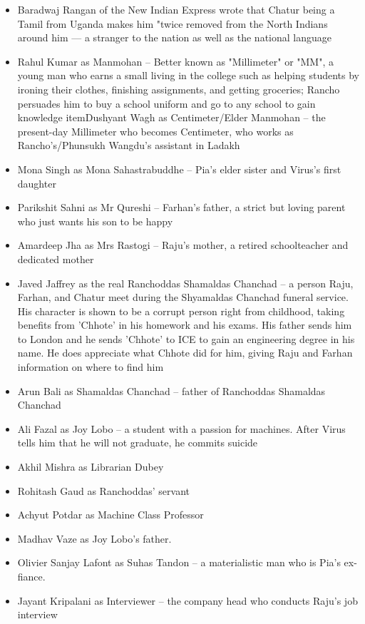 \documentclass{article}
\begin{document}
\begin{itemize}
    \item{Baradwaj Rangan of the New Indian Express wrote that Chatur being a Tamil from Uganda makes him "twice removed from the North Indians around him — a stranger to the nation as well as the national language}
    \item{Rahul Kumar as Manmohan – Better known as "Millimeter" or "MM", a young man who earns a small living in the college such as helping students by ironing their clothes, finishing assignments, and getting groceries; Rancho persuades him to buy a school uniform and go to any school to gain knowledge}
    item{Dushyant Wagh as Centimeter/Elder Manmohan – the present-day Millimeter who becomes Centimeter, who works as Rancho's/Phunsukh Wangdu's assistant in Ladakh}
    \item{Mona Singh as Mona Sahastrabuddhe – Pia's elder sister and Virus's first daughter}
    \item{Parikshit Sahni as Mr Qureshi – Farhan's father, a strict but loving parent who just wants his son to be happy}
    \item{Amardeep Jha as Mrs Rastogi – Raju's mother, a retired schoolteacher and dedicated mother}
    \item{Javed Jaffrey as the real Ranchoddas Shamaldas Chanchad – a person Raju, Farhan, and Chatur meet during the Shyamaldas Chanchad funeral service. His character is shown to be a corrupt person right from childhood, taking benefits from 'Chhote' in his homework and his exams. His father sends him to London and he sends 'Chhote' to ICE to gain an engineering degree in his name. He does appreciate what Chhote did for him, giving Raju and Farhan information on where to find him}
    \item{Arun Bali as Shamaldas Chanchad – father of Ranchoddas Shamaldas Chanchad}
    \item{Ali Fazal as Joy Lobo – a student with a passion for machines. After Virus tells him that he will not graduate, he commits suicide}
    \item{Akhil Mishra as Librarian Dubey}
    \item{Rohitash Gaud as Ranchoddas' servant}
    \item{Achyut Potdar as Machine Class Professor}
    \item{Madhav Vaze as Joy Lobo's father.}
    \item{Olivier Sanjay Lafont as Suhas Tandon – a materialistic man who is Pia's ex-fiance.}
    \item{Jayant Kripalani as Interviewer – the company head who conducts Raju's job interview}
\end{itemize}
\end{document}
